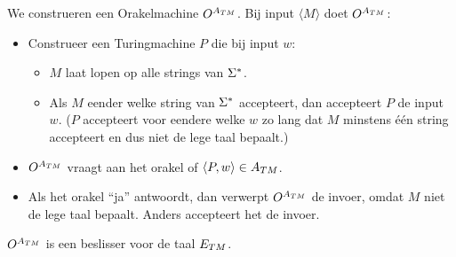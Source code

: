   We construeren een Orakelmachine ${O^{{A_{TM}}}}$. Bij input $\langle M \rangle$ doet ${O^{{A_{TM}}}}$:
  \begin{itemize}
  \item Construeer een Turingmachine $P$ die bij input $w$:
  \begin{itemize}
  \item $M$ laat lopen op alle strings van $\Sigma^*$.
  \item Als $M$ eender welke string van $\Sigma^*$ accepteert, dan accepteert $P$ de input $w$. ($P$ accepteert voor eendere welke $w$ zo lang dat $M$ minstens \'e\'en string accepteert en dus niet de lege taal bepaalt.)
  \end{itemize}
  \item ${O^{{A_{TM}}}}$ vraagt aan het orakel of $\langle P,w \rangle \in {A_{TM}}$.
  \item Als het orakel ``ja'' antwoordt, dan verwerpt ${O^{{A_{TM}}}}$ de invoer, omdat $M$ niet de lege taal bepaalt. Anders accepteert het de invoer.
  \end{itemize}
  
  ${O^{{A_{TM}}}}$ is een beslisser voor de taal ${E_{TM}}$.